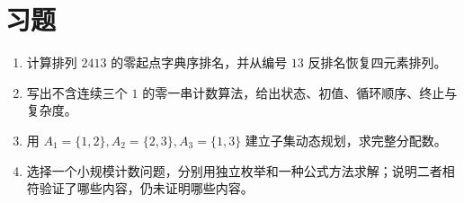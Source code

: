 \section{习题}
\begin{enumerate}
  \item\label{ex:algorithms-1} 计算排列 $2413$ 的零起点字典序排名，并从编号 $13$ 反排名恢复四元素排列。
  \item\label{ex:algorithms-2} 写出不含连续三个 $1$ 的零一串计数算法，给出状态、初值、循环顺序、终止与复杂度。
  \item\label{ex:algorithms-3} 用 $A_1=\{1,2\},A_2=\{2,3\},A_3=\{1,3\}$ 建立子集动态规划，求完整分配数。
  \item\label{ex:algorithms-4} 选择一个小规模计数问题，分别用独立枚举和一种公式方法求解；说明二者相符验证了哪些内容，仍未证明哪些内容。
\end{enumerate}

